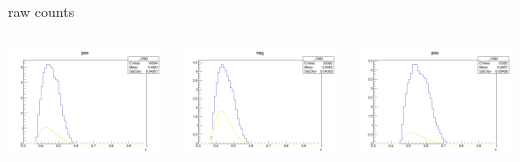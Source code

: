\begin{frame}{raw counts}
\begin{columns}
\begin{column}[T]{0.25\textwidth}
\includegraphics[width = \textwidth]{results/yield/statistics/yield_x_Q2_z_0.60_5.500_0.45_pos.png}
\end{column}
\begin{column}[T]{0.25\textwidth}
\includegraphics[width = \textwidth]{results/yield/statistics/yield_x_Q2_z_0.60_5.500_0.45_neg.png}
\end{column}
\begin{column}[T]{0.25\textwidth}
\includegraphics[width = \textwidth]{results/yield/statistics/yield_x_Q2_z_0.60_5.500_0.55_pos.png}

\end{column}
\end{columns}
\end{frame}
